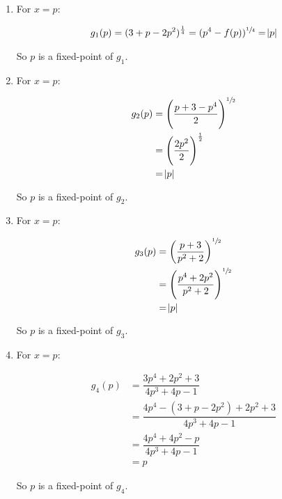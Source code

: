 \documentclass[../../../../Assignments]{subfiles}
\begin{document}
\begin{solution}
    \begin{enumerate}[label = \alph*)]
        \item For \(x = p\):

            \[\begin{aligned}
                g_1(p) = (3 + p - 2p^2)^{\frac{1}{4}} = (p^4 - f(p))^{\sfrac{1}{4}} = \abs{p}
            \end{aligned}\]

            So \(p\) is a fixed-point of \(g_1\).

        \item For \(x = p\):

            \[\begin{aligned}
                g_2(p) &= \left(\dfrac{p + 3 - p^4}{2}\right)^{\sfrac{1}{2}} \\
                       &= \left(\dfrac{2p^2}{2}\right)^{\frac{1}{2}} \\
                       &= \abs{p}
            \end{aligned}\]

            So \(p\) is a fixed-point of \(g_2\).

        \item For \(x = p\):

            \[\begin{aligned}
                g_3(p) &= \left(\dfrac{p + 3}{p^2 + 2}\right)^{\sfrac{1}{2}} \\
                       &= \left(\dfrac{p^4 + 2p^2}{p^2 + 2}\right)^{\sfrac{1}{2}} \\
                       &= \abs{p}
            \end{aligned}\]

            So \(p\) is a fixed-point of \(g_3\).

        \item For \(x = p\):

            \[\begin{aligned}
                g_4(p) &= \dfrac{3p^4 + 2p^2 + 3}{4p^3 + 4p - 1} \\
                       &= \dfrac{4p^4 - (3 + p - 2p^2) + 2p^2 + 3}{4p^3 + 4p - 1} \\
                       &= \dfrac{4p^4 + 4p^2 -p}{4p^3 + 4p - 1} \\
                       &= p
            \end{aligned}\]

            So \(p\) is a fixed-point of \(g_4\).
    \end{enumerate}
\end{solution}
\end{document}
